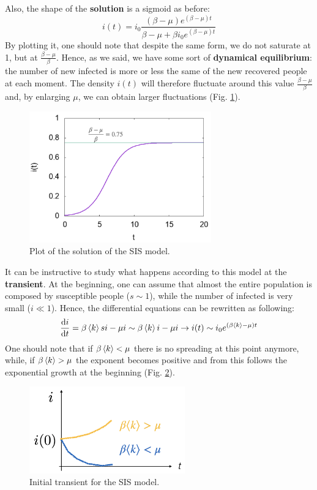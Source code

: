 \documentclass[../main/main.tex]{subfiles}
\begin{document}
Also, the shape of the \textbf{solution} is a sigmoid as before:
\begin{equation}
  i(t) = i_0 \frac{(\beta - \mu ) e^{(\beta - \mu )t} }{\beta - \mu  + \beta i_0 e^{(\beta - \mu )t} }
\end{equation}
By plotting it, one should note that despite the same form, we do not saturate at 1, but at $ \frac{\beta - \mu }{\beta } $. Hence, as we said, we have some sort of \textbf{dynamical equilibrium}: the number of new infected is more or less the same of the new recovered people at each moment. The density $i(t)$ will therefore fluctuate around this value $\frac{\beta - \mu }{\beta }$ and, by enlarging \( \mu  \), we can obtain larger fluctuations (Fig. \ref{fig:3_3}).
\begin{figure}[h!]
\centering
\includegraphics[width=0.7\textwidth]{../lessons/image/03/3.png}
\caption{\label{fig:3_3} Plot of the solution of the SIS model.}
\end{figure}

It can be instructive to study what happens according to this model at the \textbf{transient}. At the beginning, one can assume that almost the entire population is composed by susceptible  people ($ s \sim 1 $), while the number of infected is very small ($ i \ll 1 $).
Hence, the differential equations can be rewritten as following:
\begin{equation*}
  \dv{i}{t} = \beta \expval{k} s i - \mu i \sim \beta \expval{k} i - \mu i \rightarrow i(t) \sim i_0 e^{(\beta \expval{k} - \mu  )t}
\end{equation*}
One should note that if \( \beta \expval{k} < \mu   \) there is no spreading at this point anymore, while, if \( \beta \expval{k} > \mu   \) the exponent becomes positive and from this follows the exponential growth at the beginning (Fig. \ref{fig:3_4}).

\begin{figure}[h!]
\centering
\includegraphics[width=0.6\textwidth]{../lessons/image/03/4.png}
\caption{\label{fig:3_4} Initial transient for the SIS model.}
\end{figure}
\end{document}
